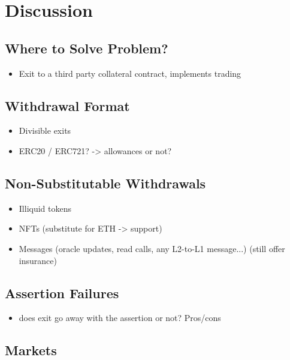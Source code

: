 
\section{Discussion}

\subsection{Where to Solve Problem? }
\begin{itemize}
\item Exit to a third party collateral contract, implements trading
\end{itemize}

\subsection{Withdrawal Format }
\begin{itemize}
\item Divisible exits
\item ERC20 / ERC721? -> allowances or not? 
\end{itemize}

\subsection{Non-Substitutable Withdrawals}

\begin{itemize}
\item Illiquid tokens 
\item NFTs (substitute for ETH -> support)
\item Messages (oracle updates, read calls, any L2-to-L1 message...) (still offer insurance)
\end{itemize}

\subsection{Assertion Failures}

\begin{itemize}
\item does exit go away with the assertion or not? Pros/cons
\end{itemize}

\subsection{Markets}

